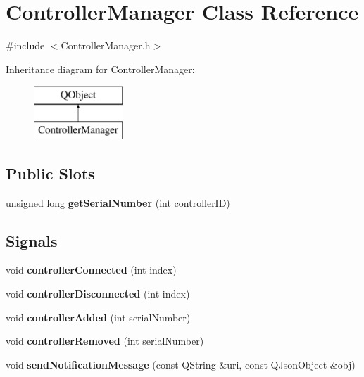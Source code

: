 \hypertarget{class_controller_manager}{}\section{Controller\+Manager Class Reference}
\label{class_controller_manager}


{\ttfamily \#include $<$Controller\+Manager.\+h$>$}

Inheritance diagram for Controller\+Manager\+:\begin{figure}[H]
\begin{center}
\leavevmode
\includegraphics[height=2.000000cm]{class_controller_manager}
\end{center}
\end{figure}
\subsection*{Public Slots}
\begin{DoxyCompactItemize}
\item 
\mbox{\label{class_controller_manager_a5b496ff2650f4048dc91de9cdeea43c8}} 
unsigned long {\bfseries get\+Serial\+Number} (int controller\+ID)
\end{DoxyCompactItemize}
\subsection*{Signals}
\begin{DoxyCompactItemize}
\item 
\mbox{\label{class_controller_manager_a1392fb567beb3f56cfa785b0e22a3f66}} 
void {\bfseries controller\+Connected} (int index)
\item 
\mbox{\label{class_controller_manager_ab8ba90b458fd9d908750780fbec96648}} 
void {\bfseries controller\+Disconnected} (int index)
\item 
\mbox{\label{class_controller_manager_a9805e7ba56ec76fe4f6157c2efa84164}} 
void {\bfseries controller\+Added} (int serial\+Number)
\item 
\mbox{\label{class_controller_manager_a1c7c0a7ede1844ebddd7c3f215fe9377}} 
void {\bfseries controller\+Removed} (int serial\+Number)
\item 
\mbox{\label{class_controller_manager_a179fc638c42252b49c845d0d0e2add56}} 
void {\bfseries send\+Notification\+Message} (const Q\+String \&uri, const Q\+Json\+Object \&obj)
\end{DoxyCompactItemize}
